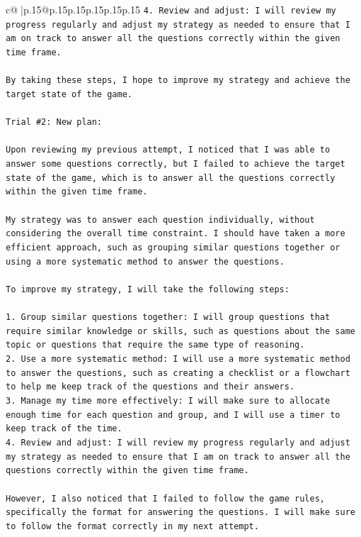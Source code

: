 \documentclass{article}
\begin{document}
{\begin{supertabular}{c@{$\;$}|p{.15\linewidth}@{}p{.15\linewidth}p{.15\linewidth}p{.15\linewidth}p{.15\linewidth}p{.15\linewidth}}
{{{\texttt{4. Review and adjust: I will review my progress regularly and adjust my strategy as needed to ensure that I am on track to answer all the questions correctly within the given time frame.} \\
\\ 
\texttt{By taking these steps, I hope to improve my strategy and achieve the target state of the game.} \\
\\ 
\texttt{Trial \#2: New plan: } \\
\\ 
\texttt{Upon reviewing my previous attempt, I noticed that I was able to answer some questions correctly, but I failed to achieve the target state of the game, which is to answer all the questions correctly within the given time frame. } \\
\\ 
\texttt{My strategy was to answer each question individually, without considering the overall time constraint. I should have taken a more efficient approach, such as grouping similar questions together or using a more systematic method to answer the questions.} \\
\\ 
\texttt{To improve my strategy, I will take the following steps:} \\
\\ 
\texttt{1. Group similar questions together: I will group questions that require similar knowledge or skills, such as questions about the same topic or questions that require the same type of reasoning.} \\
\texttt{2. Use a more systematic method: I will use a more systematic method to answer the questions, such as creating a checklist or a flowchart to help me keep track of the questions and their answers.} \\
\texttt{3. Manage my time more effectively: I will make sure to allocate enough time for each question and group, and I will use a timer to keep track of the time.} \\
\texttt{4. Review and adjust: I will review my progress regularly and adjust my strategy as needed to ensure that I am on track to answer all the questions correctly within the given time frame.} \\
\\ 
\texttt{However, I also noticed that I failed to follow the game rules, specifically the format for answering the questions. I will make sure to follow the format correctly in my next attempt.} \\
}}}
\end{supertabular}}
\end{document}
